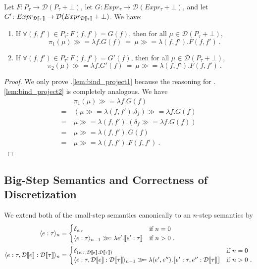 \begin{lemma}
	\label{lem:bind_project}
	Let $F\colon P_\tau \to \mathcal{D}(P_\tau + \bot)$, let $G\colon Expr_\tau \to \mathcal{D}(Expr_\tau + \bot)$, and let $G' \colon Expr_{\mathcal{D}\llbracket \tau \rrbracket} \to \mathcal{D}(Expr_{\mathcal{D}\llbracket \tau \rrbracket} + \bot)$. We have:
	\begin{enumerate}
		\item\label{lem:bind_project1} If  $\forall (f,f') \in P_\tau\colon F(f,f') = G(f)$, then for all $\mu \in \mathcal{D}(P_\tau + \bot)$,
		\[
		\pi_1(\mu) \gg\!= \lambda f. G(f)
		~{}={}~
		\mu \gg\!= \lambda (f,f'). F(f,f')~.
		\]
		\item\label{lem:bind_project2} If  $\forall (f,f') \in P_\tau\colon F(f,f') = G'(f)$, then for all $\mu \in \mathcal{D}(P_\tau + \bot)$,
		\[
		\pi_2(\mu) \gg\!= \lambda f. G'(f)
		~{}={}~
		\mu \gg\!= \lambda (f,f'). F(f,f')~.
		\]
	\end{enumerate}
\end{lemma}
%
%
\begin{proof}
	We only prove .\ref{lem:bind_project1} because the reasoning for .\ref{lem:bind_project2} is completely analogous. We have
	\begin{align*}
		& \pi_1(\mu) \gg\!= \lambda f. G(f) \\
		{}={}~& (\mu \gg\!= \lambda (f,f'). \delta_f) \gg\!= \lambda f. G(f) 
		\tag{definition} \\
		{}={}~& \mu \gg\!= \lambda (f,f'). (\delta_f \gg\!= \lambda f. G(f))
		\tag{monad assoc.} \\
		{}={}~& \mu \gg\!= \lambda (f,f'). G(f)
		\tag{monad neutral} \\
		{}={}~& \mu \gg\!= \lambda (f,f'). F(f,f')~.
		\tag{assumption} 
	\end{align*}
\end{proof}

\subsection{Big-Step Semantics and Correctness of Discretization}
%
We extend both of the small-step semantics canonically to an $n$-step semantics by%
\begin{align*}
		\langle e : \tau \rangle_{n} &{}= 
		\begin{cases}
			\delta_{e : \tau} & \text{if $n = 0$} \\
			\langle e : \tau \rangle_{n-1} \gg\!\!=  \lambda e'. \llbracket e' : \tau \rrbracket & \text{if $n > 0$}~.
		\end{cases} \\
		\langle e : \tau, \mathcal{D}\llbracket e \rrbracket : \mathcal{D}\llbracket \tau \rrbracket \rangle_{n} &{}= 
		\begin{cases}
			\delta_{(e : \tau, \mathcal{D}\llbracket e \rrbracket : \mathcal{D}\llbracket \tau \rrbracket)} & \text{if $n = 0$} \\
			\langle e : \tau, \mathcal{D}\llbracket e \rrbracket : \mathcal{D}\llbracket \tau \rrbracket \rangle_{n-1} \gg\!\!=  \lambda (e', e''). \llbracket e' : \tau, e'' : \mathcal{D}\llbracket \tau \rrbracket \rrbracket & \text{if $n > 0$}~.
		\end{cases}
\end{align*}
%
%

